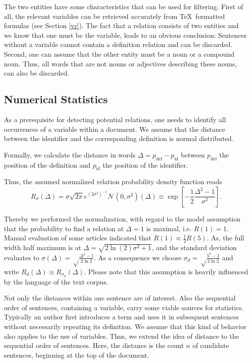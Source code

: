 \documentclass[runningheads]{llncs}
\begin{document}
The two entities have some characteristics that can be used for filtering. First of all, the relevant variables can be retrieved accurately from \TeX\ formatted formulas (see Section \ref{vr}). The fact that a relation consists of two entities and we know that one must be the variable, leads to an obvious conclusion: Sentences without a variable cannot contain a definition relation and can be discarded.
Second, one can assume that the other entity must be a noun or a compound noun. Thus, all words that are not nouns or adjectives describing these nouns, can also be discarded.


\subsection{Numerical Statistics}
As a prerequisite for detecting potential relations, one needs to identify all occurrences of a variable within a document.
We assume that the distance between the identifier and the corresponding definition is normal distributed.

Formally, we calculate the distance in words $\Delta=p_\mathrm{def}-p_\mathrm{id}$  between $p_\mathrm{def}$ the position of the definition and $p_\mathrm{id}$ the position of the identifier.

Thus, the assumed normalized relation probability density function reads
\begin{equation}
\label{eq:dist}
R_\sigma(\Delta)= {\sigma \sqrt{2\pi}}{e^{{\left(2\sigma^2\right)^{-1}}}} \mathcal N(0,\sigma^2)(\Delta)\equiv \exp\left[-\frac{1}{2}\frac{\Delta^2-1}{\sigma^2}\right].
\end{equation}
\newcommand{\normalPlot}[2]{(e^((-1/2)*(((#1)^2-1)/(#2)^2)))} %
\newcommand{\normalPlotFWHM}[2]{\normalPlot{#1}{ sqrt(((#2)^2-1)/(2*ln(2)))}}

Thereby we performed the normalization, with regard to the model assumption that the probability to find a relation at $\Delta=1$ is maximal, i.e. $R(1)=1$. 
Manual evaluation of some articles indicated that $R(1)\approx\frac{1}{2}R(5)$.
As, the full width half maximum is at $\Delta=\sqrt{2 \ln(2)  \sigma^2+1}$, and the standard deviation evaluates to $\sigma(\Delta)=\sqrt\frac{\Delta^2-1}{2\ln 2}$. As a consequence we choose $\sigma_d=\sqrt\frac{5^2-1}{2\ln 2}$ and write $R_\mathrm{d}(\Delta) \equiv R_{\sigma_\mathrm{d}}(\Delta) $. Please note that this assumption is heavily influenced by the language of the text corpus. 

Not only the distances within one sentence are of interest. Also the sequential order of sentences, containing a variable, carry some viable sources for statistics. Typically an author first introduces a term and uses it in subsequent sentences without necessarily repeating its definition. We assume that this kind of behavior also applies to the use of variables. Thus, we extend the idea of distance to the sequential order of sentences. Here, the distance is the count $n$ of candidate sentences, beginning at the top of the document.
\end{document}
